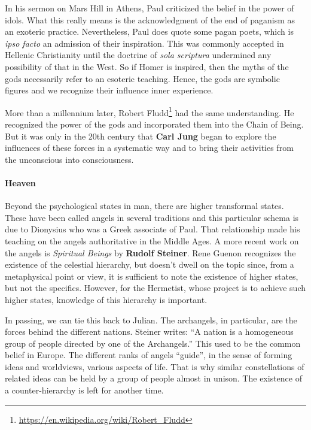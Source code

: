 In his sermon on Mars Hill in Athens, Paul criticized the belief in the power of idols. What this really means is the acknowledgment of the end of paganism as an exoteric practice. Nevertheless, Paul does quote some pagan poets, which is \emph{ipso facto} an admission of their inspiration. This was commonly accepted in Hellenic Christianity until the doctrine of \emph{sola scriptura} undermined any possibility of that in the West. So if Homer is inspired, then the myths of the gods necessarily refer to an esoteric teaching. Hence, the gods are symbolic figures and we recognize their influence inner experience.

More than a millennium later, Robert Fludd\footnote{\url{https://en.wikipedia.org/wiki/Robert_Fludd}} had the same understanding. He recognized the power of the gods and incorporated them into the Chain of Being. But it was only in the 20th century that \textbf{Carl Jung} began to explore the influences of these forces in a systematic way and to bring their activities from the unconscious into consciousness.

\paragraph{Heaven}


Beyond the psychological states in man, there are higher transformal states. These have been called angels in several traditions and this particular schema is due to Dionysius who was a Greek associate of Paul. That relationship made his teaching on the angels authoritative in the Middle Ages. A more recent work on the angels is \emph{Spiritual Beings} by \textbf{Rudolf Steiner}. Rene Guenon recognizes the existence of the celestial hierarchy, but doesn't dwell on the topic since, from a metaphysical point or view, it is sufficient to note the existence of higher states, but not the specifics. However, for the Hermetist, whose project is to achieve such higher states, knowledge of this hierarchy is important.

In passing, we can tie this back to Julian. The archangels, in particular, are the forces behind the different nations. Steiner writes: ``A nation is a homogeneous group of people directed by one of the Archangels.'' This used to be the common belief in Europe. The different ranks of angels ``guide'', in the sense of forming ideas and worldviews, various aspects of life. That is why similar constellations of related ideas can be held by a group of people almost in unison. The existence of a counter-hierarchy is left for another time.



